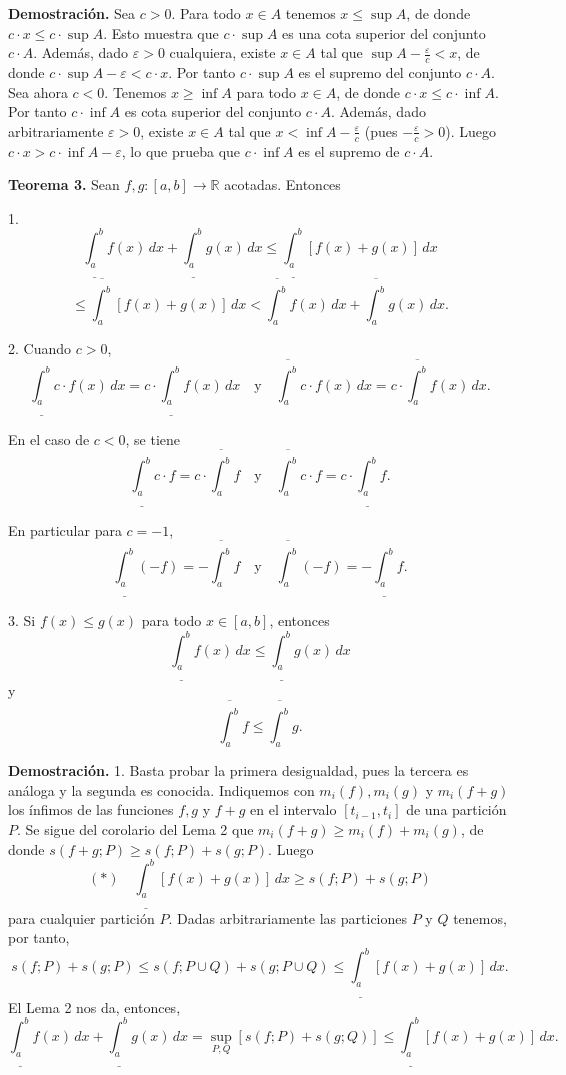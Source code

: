 \documentclass[12pt,oneside]{book}
\begin{document}
\textbf{Demostración.} Sea \(c > 0\). Para todo \(x \in A\) tenemos \(x \leq \sup A\), de donde \(c \cdot x \leq c \cdot \sup A\). Esto muestra que \(c \cdot \sup A\) es una cota superior del conjunto \(c \cdot A\). Además, dado \(\varepsilon > 0\) cualquiera, existe \(x \in A\) tal que \(\sup A - \frac{\varepsilon}{c} < x\), de donde \(c \cdot \sup A - \varepsilon < c \cdot x\). Por tanto \(c \cdot \sup A\) es el supremo del conjunto \(c \cdot A\). Sea ahora \(c < 0\). Tenemos \(x \geq \inf A\) para todo \(x \in A\), de donde \(c \cdot x \leq c \cdot \inf A\). Por tanto \(c \cdot \inf A\) es cota superior del conjunto \(c \cdot A\). Además, dado arbitrariamente \(\varepsilon > 0\), existe \(x \in A\) tal que \(x < \inf A - \frac{\varepsilon}{c}\) (pues \(-\frac{\varepsilon}{c} > 0\)). Luego \(c \cdot x > c \cdot \inf A - \varepsilon\), lo que prueba que \(c \cdot \inf A\) es el supremo de \(c \cdot A\).

\textbf{Teorema 3.} Sean \(f, g: [a, b] \to \mathbb{R}\) acotadas. Entonces

1. \[
\underline{\int_a^b} f(x) \, dx + \underline{\int_a^b} g(x) \, dx \leq \underline{\int_a^b} [f(x) + g(x)] \, dx\]\[\leq \overline{\int_a^b} [f(x) + g(x)] \, dx < \overline{\int_a^b} f(x) \, dx + \overline{\int_a^b} g(x) \, dx.
\]

2. Cuando \(c > 0\),
\[
\underline{\int_a^b} c \cdot f(x) \, dx = c \cdot \underline{\int_a^b} f(x) \, dx \quad \text{y} \quad \overline{\int_a^b} c \cdot f(x) \, dx = c \cdot \overline{\int_a^b} f(x) \, dx.
\]

En el caso de \(c < 0\), se tiene
\[
\underline{\int_a^b} c \cdot f = c \cdot \overline{\int_a^b} f \quad \text{y} \quad \overline{\int_a^b} c \cdot f = c \cdot \underline{\int_a^b} f.
\]

En particular para \(c = -1\),
\[
\underline{\int_a^b} (-f) = -\overline{\int_a^b} f \quad \text{y} \quad \overline{\int_a^b} (-f) = -\underline{\int_a^b} f.
\]

3. Si \( f(x) \leq g(x) \) para todo \( x \in [a, b] \), entonces
\[
\underline{\int_a^b} f(x) \, dx \leq \underline{\int_a^b} g(x) \, dx
\]
y
\[
\overline{\int_a^b} f \leq \overline{\int_a^b} g.
\]

\textbf{Demostración.} 1. Basta probar la primera desigualdad, pues la tercera es análoga y la segunda es conocida. Indiquemos con \( m_i(f), m_i(g) \) y \( m_i(f+g) \) los ínfimos de las funciones \( f, g \) y \( f+g \) en el intervalo \([t_{i-1}, t_i]\) de una partición \( P \). Se sigue del corolario del Lema 2 que \( m_i(f+g) \geq m_i(f) + m_i(g) \), de donde \( s(f+g; P) \geq s(f; P) + s(g; P) \). Luego
\[
(*) \quad \underline{\int_a^b} [f(x) + g(x)] \, dx \geq s(f; P) + s(g; P)
\]
para cualquier partición \( P \). Dadas arbitrariamente las particiones \( P \) y \( Q \) tenemos, por tanto,
\[
s(f; P) + s(g; P) \leq s(f; P \cup Q) + s(g; P \cup Q) \leq \underline{\int_a^b} [f(x) + g(x)] \, dx.
\]
El Lema 2 nos da, entonces,
\[
\underline{\int_a^b} f(x) \, dx + \underline{\int_a^b} g(x) \, dx = \sup_{P, Q} [s(f; P) + s(g; Q)] \leq \underline{\int_a^b} [f(x) + g(x)] \, dx.
\]
\end{document}
